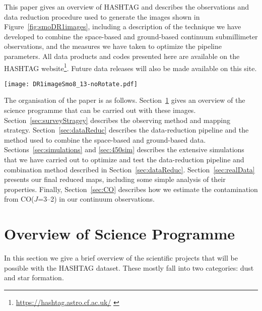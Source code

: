 \documentclass[a4paper,fleqn,usenatbib, twocolumn]{aastex63}
\begin{document}
This paper gives an overview of HASHTAG and describes the observations and
data reduction procedure used to generate the images shown in Figure~\ref{fig:smoDR1images},
including a description of the technique we have developed to combine the
space-based and ground-based continuum submillimeter observations, and the measures
we have taken to optimize the pipeline parameters. 
All data products and codes presented here are available on the HASHTAG website\footnote{\url{https://hashtag.astro.cf.ac.uk/} \label{foot:web}}.
Future data releases will also be made available on this site.

\begin{figure*}
  \centering
  \texttt{[image: DR1imageSmo8\_13-noRotate.pdf]}
  \caption{The HASHTAG images created from the first $\sim$70\% of the final SCUBA-2 dataset. The 450 and \SI{850}{\micro\meter} images
  have been smoothed with a 7.9, and 13\arcsec\ FWHM Gaussian, respectively. For the raw-resolution images see Figure~\ref{fig:DR1images}.}
  \label{fig:smoDR1images}
\end{figure*}


The organisation of the paper is as follows. 
Section~\ref{sec:scienceOverview} gives an overview of the science programme that can be carried out
with these images.
Section~\ref{sec:surveyStragey} describes the observing
method and mapping strategy. Section~\ref{sec:dataReduc} describes the data-reduction pipeline and
the method used to combine the space-based and ground-based
data. Sections~\ref{sec:simulations} and \ref{sec:450sim} describes the extensive simulations that we have carried out
to optimize and test the data-reduction pipeline and combination method
described in Section~\ref{sec:dataReduc}. Section~\ref{sec:realData} presents our final reduced maps, including some simple analysis
of their properties. Finally, Section~\ref{sec:CO} describes how we estimate the contamination from CO($J$=3--2) in our
continuum observations.



\section{Overview of Science Programme}
\label{sec:scienceOverview}

In this section we give a brief overview of the scientific projects that
will be possible with the HASHTAG dataset. These mostly fall into two categories:
dust and star formation.
\end{document}
